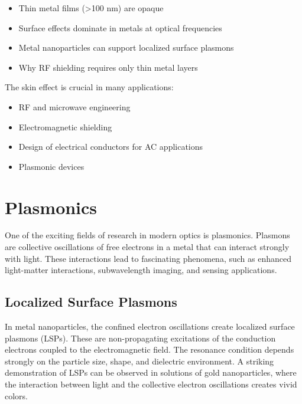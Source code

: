 \documentclass[
  a4paper,
]{book}
\providecommand{\tightlist}{%
  \setlength{\itemsep}{0pt}\setlength{\parskip}{0pt}}
\begin{document}
\begin{itemize}
\tightlist
\item
  Thin metal films (\textgreater100 nm) are opaque
\item
  Surface effects dominate in metals at optical frequencies
\item
  Metal nanoparticles can support localized surface plasmons
\item
  Why RF shielding requires only thin metal layers
\end{itemize}

The skin effect is crucial in many applications:

\begin{itemize}
\tightlist
\item
  RF and microwave engineering
\item
  Electromagnetic shielding
\item
  Design of electrical conductors for AC applications
\item
  Plasmonic devices
\end{itemize}

\section{Plasmonics}\label{plasmonics}

One of the exciting fields of research in modern optics is plasmonics.
Plasmons are collective oscillations of free electrons in a metal that
can interact strongly with light. These interactions lead to fascinating
phenomena, such as enhanced light-matter interactions, subwavelength
imaging, and sensing applications.

\subsection{Localized Surface
Plasmons}\label{localized-surface-plasmons}

In metal nanoparticles, the confined electron oscillations create
localized surface plasmons (LSPs). These are non-propagating excitations
of the conduction electrons coupled to the electromagnetic field. The
resonance condition depends strongly on the particle size, shape, and
dielectric environment. A striking demonstration of LSPs can be observed
in solutions of gold nanoparticles, where the interaction between light
and the collective electron oscillations creates vivid colors.
\end{document}
